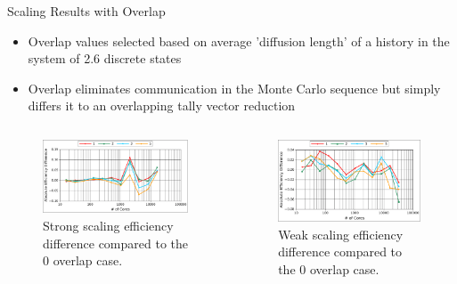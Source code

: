 \documentclass{beamer}
\begin{document}
\begin{frame}{Scaling Results with Overlap}

  \begin{itemize}
  \item Overlap values selected based on average 'diffusion length' of
    a history in the system of 2.6 discrete states
    \bigskip
  \item Overlap eliminates communication in the Monte Carlo sequence
    but simply differs it to an overlapping tally vector reduction
  \end{itemize}

  \begin{columns}
    \begin{column}{0.5\textwidth}

      \begin{figure}[htpb!]
        \begin{center}
          \includegraphics[width=2.4in]{titan_strong_overlap_diff.pdf}
        \end{center}
        \caption{Strong scaling efficiency difference compared to the
          0 overlap case.}
      \end{figure}

    \end{column}

    \begin{column}{0.5\textwidth}

      \begin{figure}[htpb!]
        \begin{center}
          \includegraphics[width=2.4in]{titan_weak_overlap_diff.pdf}
        \end{center}
        \caption{Weak scaling efficiency difference compared to the 0
          overlap case.}
      \end{figure}

    \end{column}
  \end{columns}

\end{frame}
\end{document}
